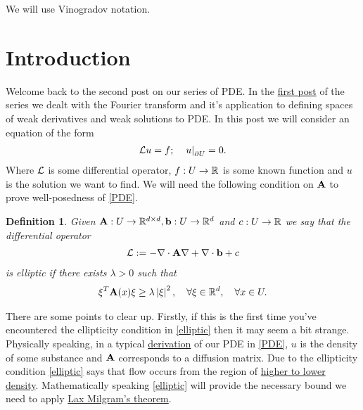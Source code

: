 \documentclass[12pt]{article}
\newtheorem{definition}[theorem]{Definition}
\theoremstyle{definition}
\newcommand\restr[2]{\left.#1\right|_{#2}}
\begin{document}
We will use Vinogradov notation.

\section{Introduction}
Welcome back to the second post on our series of PDE. In the \href{https://nowheredifferentiable.com/2023-01-29-PDE-1/}{first post} of the series we dealt with the Fourier transform and it's application to defining spaces of weak derivatives and weak solutions to PDE. In this post we will consider an equation of the form
\begin{align}\label{PDE}
	\Ll u =f; \quad \restr{u}{\partial U} =0.
\end{align}
Where $\mathcal{L}$ is some differential operator, $f: U \to  \mathbb{R}$  is some known function and $u$ is the solution we want to find. We will need the following condition on $\vb{A}$  to prove well-posedness of \eqref{PDE}.
\begin{definition}
	Given $\vb{A}: U \to \mathbb{R}^{d \times d}, \vb{b}: U \to \mathbb{R}^d$ and $c:U \to \mathbb{R}$ we say that the differential operator
	\begin{align}\label{operator}
		\mathcal{L}:= -\nabla \cdot \vb{A} \nabla + \nabla \cdot \vb{b} +c\end{align}
	is \emph{elliptic} if there exists $\lambda >0$ such that
	\begin{align}\label{elliptic}
		\xi ^T\vb{A}(x) \xi  \geq \lambda \left| \xi  \right|^2 , \quad\forall \xi \in \mathbb{R}^d , \quad\forall x \in U .
	\end{align}
\end{definition}
There are some points to clear up. Firstly, if this is the first time you've encountered  the ellipticity condition in \eqref{elliptic} then it may seem a bit strange.  Physically speaking, in a typical \href{https://nowheredifferentiable.com/2023-12-23-PDEs-4-Physical_derivation_of_parabolic_and_elliptic_PDE/}{derivation} of our PDE in \eqref{PDE}, $u$ is the density of some substance and $\vb{A}$ corresponds to a diffusion matrix. Due to the ellipticity condition \eqref{elliptic} says that flow occurs from the region of \href{https://nowheredifferentiable.com/2023-12-23-PDEs-4-Physical_derivation_of_parabolic_and_elliptic_PDE/#:~:text=a)-,Diffusion,-%3A%20This%20is%20the}{higher to lower density}. Mathematically speaking \eqref{elliptic} will provide the necessary bound we need to apply \href{https://nowheredifferentiable.com/2023-05-30-PDE-2-Hilbert/#:~:text=degenerate.%20As%20a-,particular,-example%2C%20a%20symmetric}{Lax Milgram's theorem}.
\end{document}
